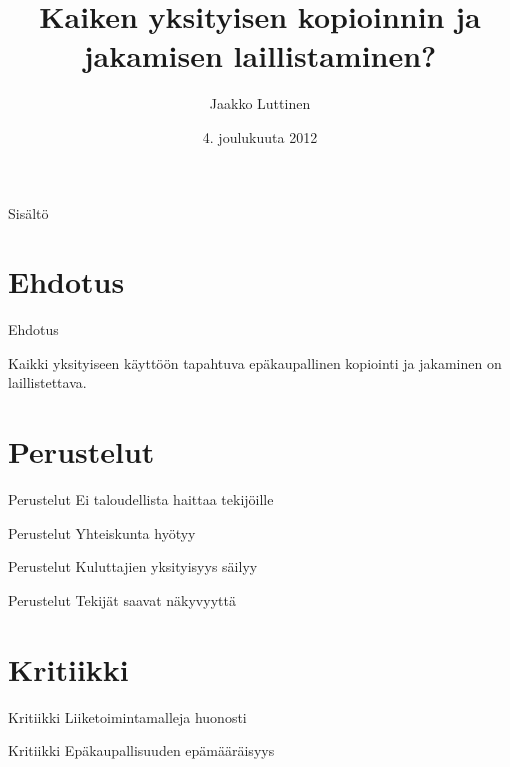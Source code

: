 \documentclass{beamer}
\title{Kaiken yksityisen kopioinnin ja jakamisen laillistaminen?}
\author{
  Jaakko Luttinen
}
\date{4. joulukuuta 2012}
\begin{document}
\maketitle

\begin{frame}{Sisältö}
  \tableofcontents
\end{frame}


\section{Ehdotus}

\begin{frame}{Ehdotus}

  \Large Kaikki yksityiseen käyttöön tapahtuva epäkaupallinen
  kopiointi ja jakaminen on laillistettava.
  
\end{frame}

\section{Perustelut}

\begin{frame}{Perustelut}
  \Large
  Ei taloudellista haittaa tekijöille
\end{frame}

\begin{frame}{Perustelut}
  \Large
  Yhteiskunta hyötyy
\end{frame}

\begin{frame}{Perustelut}
  \Large
  Kuluttajien yksityisyys säilyy
\end{frame}

\begin{frame}{Perustelut}
  \Large
  Tekijät saavat näkyvyyttä
\end{frame}

\section{Kritiikki}

\begin{frame}{Kritiikki}
  \Large
  Liiketoimintamalleja huonosti
\end{frame}

\begin{frame}{Kritiikki}
  \Large 
  Epäkaupallisuuden epämääräisyys
\end{frame}
\end{document}
